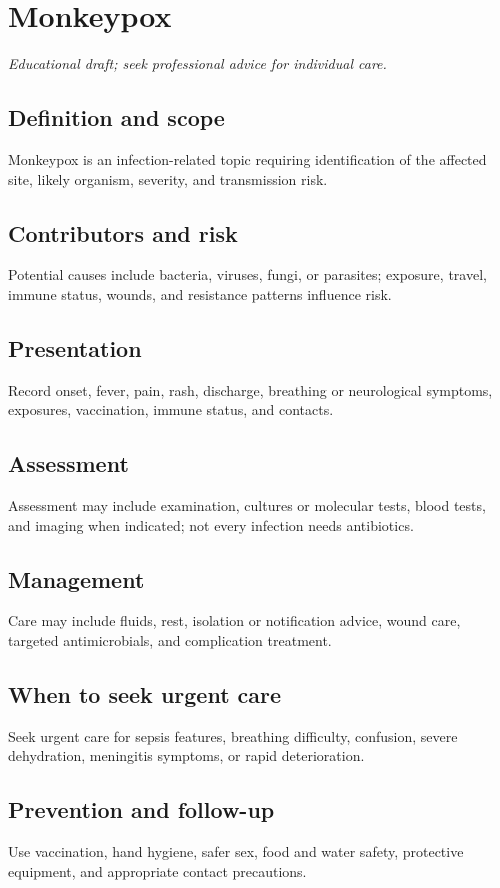\chapter{Monkeypox}

\medskip
\noindent\textit{Educational draft; seek professional advice for individual care.}

\section*{Definition and scope}
Monkeypox is an infection-related topic requiring identification of the affected site, likely organism, severity, and transmission risk.

\section*{Contributors and risk}
Potential causes include bacteria, viruses, fungi, or parasites; exposure, travel, immune status, wounds, and resistance patterns influence risk.

\section*{Presentation}
Record onset, fever, pain, rash, discharge, breathing or neurological symptoms, exposures, vaccination, immune status, and contacts.

\section*{Assessment}
Assessment may include examination, cultures or molecular tests, blood tests, and imaging when indicated; not every infection needs antibiotics.

\section*{Management}
Care may include fluids, rest, isolation or notification advice, wound care, targeted antimicrobials, and complication treatment.

\section*{When to seek urgent care}
Seek urgent care for sepsis features, breathing difficulty, confusion, severe dehydration, meningitis symptoms, or rapid deterioration.

\section*{Prevention and follow-up}
Use vaccination, hand hygiene, safer sex, food and water safety, protective equipment, and appropriate contact precautions.

